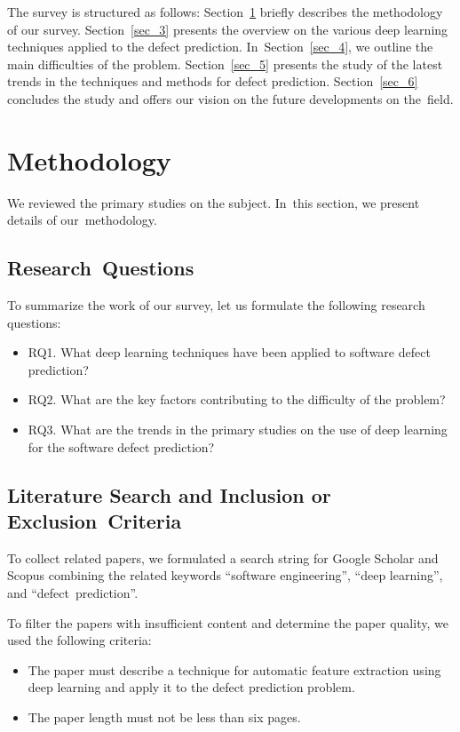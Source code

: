 \documentclass[mathematics,review,accept,moreauthors,pdftex]{Definitions/mdpi}
\begin{document}
The survey is structured as follows: Section~\ref{sec_2} briefly describes the methodology of our survey. Section~\ref{sec_3} presents the overview on the various deep learning techniques applied to the defect prediction. In~Section~\ref{sec_4}, we outline the main difficulties of the problem. Section~\ref{sec_5} presents the study of the latest trends in the techniques and methods for defect prediction. Section~\ref{sec_6} concludes the study and offers our vision on the future developments on the~field.

\section{Methodology}\label{sec_2}

We reviewed the primary studies on the subject. In~this section, we present details of our~methodology.
\pagebreak
\subsection{Research~Questions}

To summarize the work of our survey, let us formulate the following research questions:

\begin{itemize}
\item RQ1. What deep learning techniques have been applied to software defect prediction?
\item RQ2. What are the key factors contributing to the difficulty of the problem?
\item RQ3. What are the trends in the primary studies on the use of deep learning for the software defect prediction?
\end{itemize}

\subsection{Literature Search and Inclusion or Exclusion~Criteria}

To collect related papers, we formulated a search string for Google Scholar and Scopus combining the related keywords ``software engineering'', ``deep learning'', and \mbox{``defect~prediction''.}

To filter the papers with insufficient content and determine the paper quality, we used the following criteria:

\begin{itemize}
\item The paper must describe a technique for automatic feature extraction using deep learning and apply it to the defect prediction problem.
\item The paper length must not be less than six pages.
\end{itemize}
\end{document}
